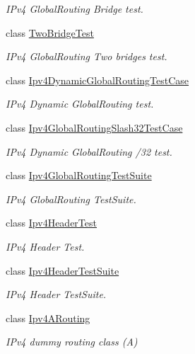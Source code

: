 \begin{DoxyCompactItemize}
\begin{DoxyCompactList}\small\item\em I\+Pv4 Global\+Routing Bridge test. \end{DoxyCompactList}\item 
class \hyperlink{classTwoBridgeTest}{Two\+Bridge\+Test}
\begin{DoxyCompactList}\small\item\em I\+Pv4 Global\+Routing Two bridges test. \end{DoxyCompactList}\item 
class \hyperlink{classIpv4DynamicGlobalRoutingTestCase}{Ipv4\+Dynamic\+Global\+Routing\+Test\+Case}
\begin{DoxyCompactList}\small\item\em I\+Pv4 Dynamic Global\+Routing test. \end{DoxyCompactList}\item 
class \hyperlink{classIpv4GlobalRoutingSlash32TestCase}{Ipv4\+Global\+Routing\+Slash32\+Test\+Case}
\begin{DoxyCompactList}\small\item\em I\+Pv4 Dynamic Global\+Routing /32 test. \end{DoxyCompactList}\item 
class \hyperlink{classIpv4GlobalRoutingTestSuite}{Ipv4\+Global\+Routing\+Test\+Suite}
\begin{DoxyCompactList}\small\item\em I\+Pv4 Global\+Routing Test\+Suite. \end{DoxyCompactList}\item 
class \hyperlink{classIpv4HeaderTest}{Ipv4\+Header\+Test}
\begin{DoxyCompactList}\small\item\em I\+Pv4 Header Test. \end{DoxyCompactList}\item 
class \hyperlink{classIpv4HeaderTestSuite}{Ipv4\+Header\+Test\+Suite}
\begin{DoxyCompactList}\small\item\em I\+Pv4 Header Test\+Suite. \end{DoxyCompactList}\item 
class \hyperlink{classIpv4ARouting}{Ipv4\+A\+Routing}
\begin{DoxyCompactList}\small\item\em I\+Pv4 dummy routing class (A) \end{DoxyCompactList}\item 

\end{DoxyCompactItemize}
